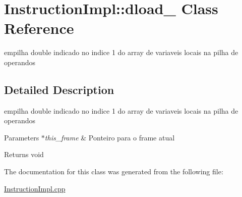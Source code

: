 \hypertarget{class_instruction_impl_1_1dload__1}{}\section{Instruction\+Impl\+:\+:dload\+\_ Class Reference}
\label{class_instruction_impl_1_1dload__1}


empilha double indicado no indice 1 do array de variaveis locais na pilha de operandos  




\subsection{Detailed Description}
empilha double indicado no indice 1 do array de variaveis locais na pilha de operandos 


\begin{DoxyParams}{Parameters}
{\em $\ast$this\+\_\+frame} & Ponteiro para o frame atual \\
\hline
\end{DoxyParams}
\begin{DoxyReturn}{Returns}
void 
\end{DoxyReturn}


The documentation for this class was generated from the following file\+:\begin{DoxyCompactItemize}
\item 
\hyperlink{_instruction_impl_8cpp}{Instruction\+Impl.\+cpp}\end{DoxyCompactItemize}

